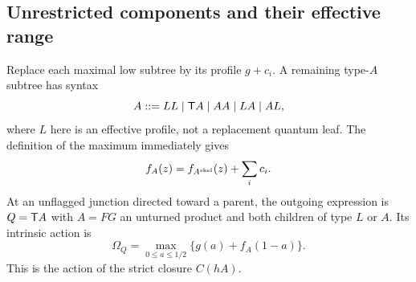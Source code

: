 \subsection{Unrestricted components and their effective range}
Replace each maximal low subtree by its profile
$g+c_i$. A remaining type-$A$ subtree has syntax
\begin{equation}\label{st:skeleton}
 A::=LL\mid\mathsf T A\mid AA\mid LA\mid AL,
\end{equation}
where $L$ here is an effective profile, not a
replacement quantum leaf. The definition of the
maximum immediately gives
\begin{equation}\label{st:constant-skeleton}
 f_A(z)=f_{A^{\rm skel}}(z)+\sum_i c_i.
\end{equation}
At an unflagged junction directed toward a parent,
the outgoing expression is $Q=\mathsf T A$ with $A=FG$
an unturned product and both children of type $L$
or $A$. Its intrinsic action is
\[
 \Omega_Q=\max_{0\le a\le1/2}
                 \{g(a)+f_A(1-a)\}.
\]
This is the action of the strict closure $C(hA)$.


